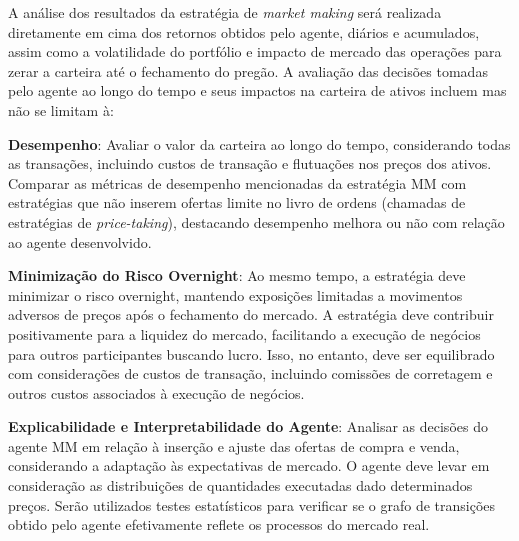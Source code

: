 A análise dos resultados da estratégia de \textit{market making} será  realizada diretamente em cima dos retornos obtidos pelo agente, diários e acumulados, assim como a volatilidade do portfólio e impacto de mercado das operações para zerar a carteira até o fechamento do pregão. A avaliação das decisões tomadas pelo agente ao longo do tempo e seus impactos na carteira de ativos incluem mas não se limitam à:

\textbf{Desempenho}: Avaliar o valor da carteira ao longo do tempo, considerando todas as transações, incluindo custos de transação e flutuações nos preços dos ativos. Comparar as métricas de desempenho mencionadas da estratégia MM com estratégias que não inserem ofertas limite no livro de ordens (chamadas de estratégias de \textit{price-taking}), destacando desempenho melhora ou não com relação ao agente desenvolvido.

\textbf{Minimização do Risco Overnight}: Ao mesmo tempo, a estratégia deve minimizar o risco overnight, mantendo exposições limitadas a movimentos adversos de preços após o fechamento do mercado.
A estratégia deve contribuir positivamente para a liquidez do mercado, facilitando a execução de negócios para outros participantes buscando lucro. Isso, no entanto, deve ser equilibrado com considerações de custos de transação, incluindo comissões de corretagem e outros custos associados à execução de negócios.

\textbf{Explicabilidade e Interpretabilidade do Agente}: Analisar as decisões do agente MM em relação à inserção e ajuste das ofertas de compra e venda, considerando a adaptação às expectativas de mercado. O agente deve levar em consideração as distribuições de quantidades executadas dado determinados preços. Serão utilizados testes estatísticos para verificar se o grafo de transições obtido pelo agente efetivamente reflete os processos do mercado real.


